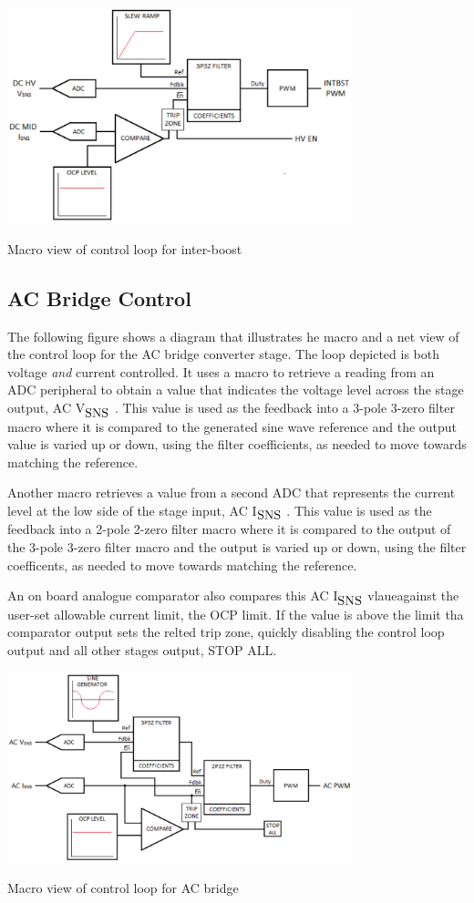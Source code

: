 \begin{DoxyImage}
\includegraphics[width=10cm]{boost_xfmr_loop}
\caption{Macro view of control loop for inter-\/boost}
\end{DoxyImage}
\hypertarget{index_acbctrl}{}\subsection{A\-C Bridge Control}\label{index_acbctrl}
The following figure shows a diagram that illustrates he macro and a net view of the control loop for the A\-C bridge converter stage. The loop depicted is both voltage {\itshape and} current controlled. It uses a macro to retrieve a reading from an A\-D\-C peripheral to obtain a value that indicates the voltage level across the stage output, A\-C V$_{\mbox{S\-N\-S}}$ . This value is used as the feedback into a 3-\/pole 3-\/zero filter macro where it is compared to the generated sine wave reference and the output value is varied up or down, using the filter coefficients, as needed to move towards matching the reference.

Another macro retrieves a value from a second A\-D\-C that represents the current level at the low side of the stage input, A\-C I$_{\mbox{S\-N\-S}}$ . This value is used as the feedback into a 2-\/pole 2-\/zero filter macro where it is compared to the output of the 3-\/pole 3-\/zero filter macro and the output is varied up or down, using the filter coefficents, as needed to move towards matching the reference.

An on board analogue comparator also compares this A\-C I$_{\mbox{S\-N\-S}}$  vlaueagainst the user-\/set allowable current limit, the O\-C\-P limit. If the value is above the limit tha comparator output sets the relted trip zone, quickly disabling the control loop output and all other stages output, S\-T\-O\-P A\-L\-L.


\begin{DoxyImage}
\includegraphics[width=10cm]{ac_bridge_loop}
\caption{Macro view of control loop for A\-C bridge}
\end{DoxyImage}
 